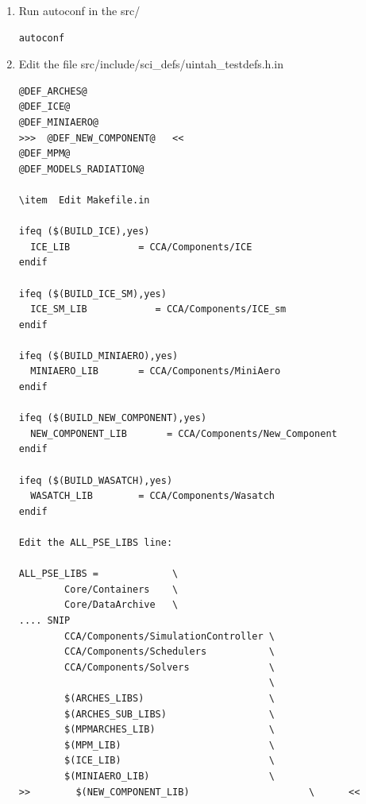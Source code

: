 \documentclass[12pt]{report}
\begin{document}
\begin{enumerate}
\begin{verbatim}
if test "$USE_NEW_COMPONENT" != ""; then
   AC_MSG_ERROR( USE_NEW_COMPONENT is deprecated.  Please use --enable-new_component. )
fi


AC_SUBST(BUILD_ARCHES)
AC_SUBST(BUILD_ICE)
AC_SUBST(BUILD_ICE_SM)
AC_SUBST(BUILD_MINIAERO)
>>  AC_SUBST(BUILD_NEW_COMPONENT)    <<
AC_SUBST(BUILD_MODELS_RADIATION)
AC_SUBST(BUILD_MPM)
AC_SUBST(BUILD_WASATCH)

AC_SUBST(DEF_ARCHES)
AC_SUBST(DEF_ICE)
AC_SUBST(DEF_ICE_SM)
AC_SUBST(DEF_MINIAERO)
>> AC_SUBST(DEF_NEW_COMPONENT)   <<
AC_SUBST(DEF_MPM)
AC_SUBST(DEF_NO_FORTRAN)
AC_SUBST(DEF_MODELS_RADIATION)
AC_SUBST(DEF_WASATCH)
AC_SUBST(NO_FORTRAN)
\end{verbatim}

\item  Run autoconf in the src/ 
\begin{verbatim}
autoconf
\end{verbatim}

\item  Edit the file src/include/sci\_defs/uintah\_testdefs.h.in

\begin{verbatim}
@DEF_ARCHES@
@DEF_ICE@
@DEF_MINIAERO@
>>>  @DEF_NEW_COMPONENT@   <<
@DEF_MPM@
@DEF_MODELS_RADIATION@

\item  Edit Makefile.in

ifeq ($(BUILD_ICE),yes)
  ICE_LIB            = CCA/Components/ICE
endif

ifeq ($(BUILD_ICE_SM),yes)
  ICE_SM_LIB            = CCA/Components/ICE_sm
endif

ifeq ($(BUILD_MINIAERO),yes)
  MINIAERO_LIB       = CCA/Components/MiniAero
endif

ifeq ($(BUILD_NEW_COMPONENT),yes)
  NEW_COMPONENT_LIB       = CCA/Components/New_Component
endif

ifeq ($(BUILD_WASATCH),yes)
  WASATCH_LIB        = CCA/Components/Wasatch
endif

Edit the ALL_PSE_LIBS line:

ALL_PSE_LIBS =             \
        Core/Containers    \
        Core/DataArchive   \
.... SNIP
        CCA/Components/SimulationController \
        CCA/Components/Schedulers           \
        CCA/Components/Solvers              \
                                            \
        $(ARCHES_LIBS)                      \
        $(ARCHES_SUB_LIBS)                  \
        $(MPMARCHES_LIB)                    \
        $(MPM_LIB)                          \
        $(ICE_LIB)                          \
        $(MINIAERO_LIB)                     \
>>        $(NEW_COMPONENT_LIB)                     \      <<
\end{verbatim}


\end{enumerate}
\end{document}
